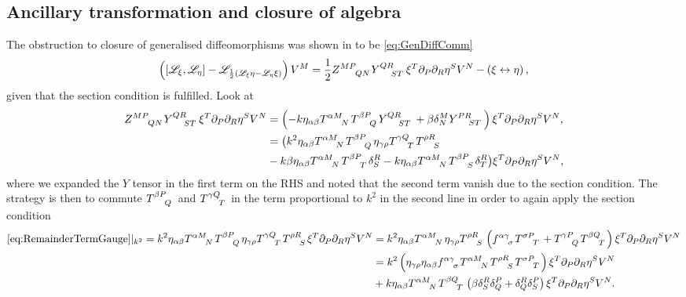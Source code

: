 \subsection{Ancillary transformation and closure of algebra}
The obstruction to closure of generalised diffeomorphisms was shown in to be  \eqref{eq:GenDiffComm} 
\begin{equation}\label{eq:GenDiffComm2}
    \left(\left[\mathscr{L}_\xi,\mathscr{L}_\eta\right]-\mathscr{L}_{\frac{1}{2}\left(\mathscr{L}_\xi\eta-\mathscr{L}_\eta\xi\right)}\right)V^M = \frac{1}{2}\tensor{Z}{^{MP}_{QN}}\tensor{Y}{^{QR}_{ST}}\xi^T\pd_P\pd_R\eta^SV^N-\left(\xi\leftrightarrow\eta\right),
\end{equation}
given that the section condition is fulfilled. Look at
\begin{equation}\label{eq:RemainderTermGauge}
    \begin{aligned}
        \tensor{Z}{^{MP}_{QN}}\tensor{Y}{^{QR}_{ST}}\xi^T\pd_P\pd_R\eta^SV^N &= \left(-k\eta_{\alpha\beta}\tensor{T}{^{\alpha M}_N}\tensor{T}{^{\beta P}_Q}\tensor{Y}{^{QR}_{ST}}+\beta \delta^M_N\tensor{Y}{^{PR}_{ST}}\right)\xi^T\pd_P\pd_R\eta^SV^N,\\
        &= \big(k^2\eta_{\alpha\beta}\tensor{T}{^{\alpha M}_N}\tensor{T}{^{\beta P}_Q}\eta_{\gamma\rho}\tensor{T}{^{\gamma Q}_T}\tensor{T}{^{\rho R}_S}\\
        &-k\beta\eta_{\alpha\beta}\tensor{T}{^{\alpha M}_N}\tensor{T}{^{\beta P}_T}\delta^R_S-k\eta_{\alpha\beta}\tensor{T}{^{\alpha M}_N}\tensor{T}{^{\beta P}_S}\delta^{R}_T\big)\xi^T\pd_P\pd_R\eta^SV^N,
    \end{aligned}
\end{equation}
where we expanded the $Y$ tensor in the first term on the RHS and noted that the second term vanish due to the section condition. The strategy is then to commute $\tensor{T}{^{\beta P}_Q}$ and $\tensor{T}{^{\gamma Q}_T}$ in the term proportional to $k^2$ in the second line in order to again apply the section condition
\begin{equation}\label{eq:UseOfSec}
    \begin{aligned}
    \eqref{eq:RemainderTermGauge}|_{k^2} = k^2\eta_{\alpha\beta}\tensor{T}{^{\alpha M}_N}\tensor{T}{^{\beta P}_Q}\eta_{\gamma\rho}\tensor{T}{^{\gamma Q}_T}\tensor{T}{^{\rho R}_S}\xi^T\pd_P\pd_R\eta^SV^N &= k^2\eta_{\alpha\beta}\tensor{T}{^{\alpha M}_N}\eta_{\gamma\rho}\tensor{T}{^{\rho R}_S}\left(\tensor{f}{^{\alpha\gamma}_\sigma}\tensor{T}{^{\sigma P}_T}+\tensor{T}{^{\gamma P}_Q}\tensor{T}{^{\beta Q}_T}\right)\xi^T\pd_P\pd_R\eta^SV^N\\
    &= k^2\left(\eta_{\gamma\rho}\eta_{\alpha\beta}\tensor{f}{^{\alpha\gamma}_\sigma}\tensor{T}{^{\alpha M}_N}\tensor{T}{^{\rho R}_S}\tensor{T}{^{\sigma P}_T}\right)\xi^T\pd_P\pd_R\eta^SV^N\\
    &+ k\eta_{\alpha\beta}\tensor{T}{^{\alpha M}_N}\tensor{T}{^{\beta Q}_T}\left(\beta\delta^R_S\delta^P_Q+\delta^R_Q\delta^P_S\right)\xi^T\pd_P\pd_R\eta^SV^N.
    \end{aligned}
\end{equation}
